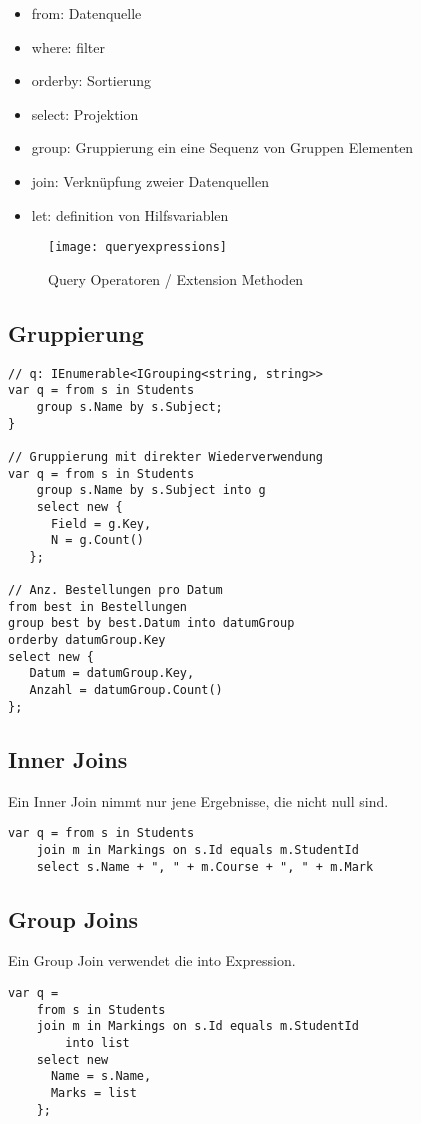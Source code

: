 \begin{itemize}
  \itemsep -0.5em 
  \item from: Datenquelle
  \item where: filter
  \item orderby: Sortierung
  \item select: Projektion
  \item group: Gruppierung ein eine Sequenz von Gruppen Elementen
  \item join: Verknüpfung zweier Datenquellen
  \item let: definition von Hilfsvariablen
\end{itemize}

\begin{figure}[h!]
  \center
  \texttt{[image: queryexpressions]}
  \caption{Query Operatoren / Extension Methoden}
\end{figure}

\subsection{Gruppierung}
\begin{lstlisting}
// q: IEnumerable<IGrouping<string, string>> 
var q = from s in Students
	group s.Name by s.Subject;
} 

// Gruppierung mit direkter Wiederverwendung
var q = from s in Students
	group s.Name by s.Subject into g 
	select new {
      Field = g.Key,
      N = g.Count()
   };

// Anz. Bestellungen pro Datum
from best in Bestellungen
group best by best.Datum into datumGroup 
orderby datumGroup.Key
select new {
   Datum = datumGroup.Key,
   Anzahl = datumGroup.Count()
};
\end{lstlisting}

\subsection{Inner Joins}
Ein Inner Join nimmt nur jene Ergebnisse, die nicht null sind.
\begin{lstlisting}
var q = from s in Students
	join m in Markings on s.Id equals m.StudentId 
	select s.Name + ", " + m.Course + ", " + m.Mark
\end{lstlisting}

\subsection{Group Joins}
Ein Group Join verwendet die into Expression.
\begin{lstlisting}
var q = 
	from s in Students 
	join m in Markings on s.Id equals m.StudentId
		into list
	select new
      Name = s.Name,
      Marks = list
	};
\end{lstlisting}

